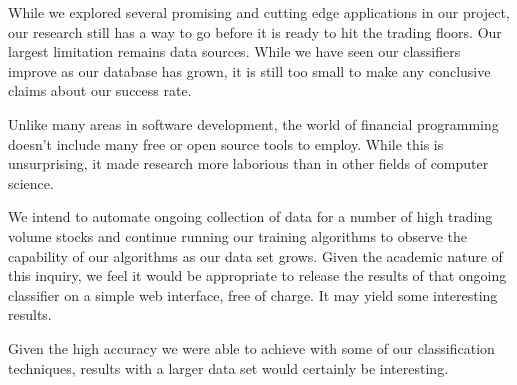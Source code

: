 \documentclass[letterpaper]{article}
\begin{document}
\noindent While we explored several promising and cutting edge applications in our project, our research still has a way to go before it is ready to hit the trading floors. Our largest limitation remains data sources.  While we have seen our classifiers improve as our database has grown, it is still too small to make any conclusive claims about our success rate.

Unlike many areas in software development, the world of financial programming doesn't include many free or open source tools to employ. While this is unsurprising, it made research more laborious than in other fields of computer science.

We intend to automate ongoing collection of data for a number of high trading volume stocks and continue running our training algorithms to observe the capability of our algorithms as our data set grows. Given the academic nature of this inquiry, we feel it would be appropriate to release the results of that ongoing classifier on a simple web interface, free of charge.  It may yield some interesting results.

Given the high accuracy we were able to achieve with some of our classification techniques, results with a larger data set would certainly be interesting. 
\end{document}
